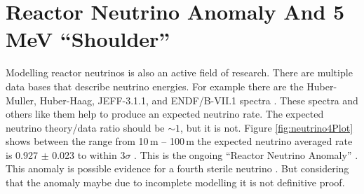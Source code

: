 \section{Reactor Neutrino Anomaly And 5\,MeV ``Shoulder''}
Modelling reactor neutrinos is also an active field of research. There are multiple data bases that describe neutrino energies. For example there are the Huber-Muller, Huber-Haag, JEFF-3.1.1, and ENDF/B-VII.1 spectra \cite{Hayes_implicationsShoulder_2015}. These spectra and others like them help to produce an expected neutrino rate. The expected neutrino theory/data ratio should be $\sim 1$, but it is not. Figure \ref{fig:neutrino4Plot} shows between the range from 10\,m -- 100\,m the expected neutrino averaged rate is 0.927 $\pm$ 0.023 to within $3 \sigma$ \cite{neutrino4_2021}. This is the ongoing ``Reactor Neutrino Anomaly'' \cite{mention_anAnomaly_2011}.  This anomaly is possible evidence for a fourth sterile neutrino \cite{mention_anAnomaly_2011}. But considering that the anomaly maybe due to incomplete modelling it is not definitive proof. %
